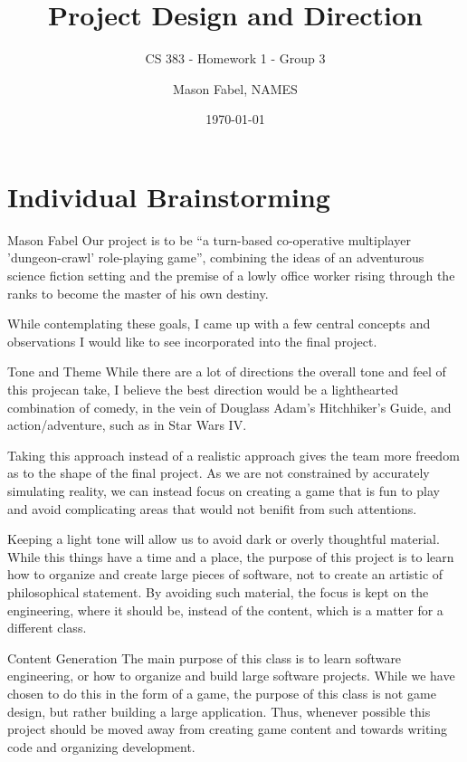 \documentclass[12pt]{report}
\title{Project Design and Direction}
\subtitle{CS 383 - Homework 1 - Group 3}
\author{Mason Fabel, NAMES} %
\date{\today}
\begin{document}
\maketitle

\chapter{Individual Brainstorming}


\begin{section}{Mason Fabel}
Our project is to be ``a turn-based co-operative multiplayer
'dungeon-crawl' role-playing game'', combining the ideas of an adventurous
science fiction setting and the premise of a lowly office worker rising
through the ranks to become the master of his own destiny.

While contemplating these goals, I came up with a few central concepts and
observations I would like to see incorporated into the final project.

\begin{subsection}{Tone and Theme}
While there are a lot of directions the overall tone and feel of this projecan take, I believe the best direction would be a lighthearted combination of comedy, in the vein of Douglass Adam's Hitchhiker's Guide, and
action/adventure, such as in Star Wars IV.

Taking this approach instead of a realistic approach gives the team more
freedom as to the shape of the final project. As we are not constrained by
accurately simulating reality, we can instead focus on creating a game that
is fun to play and avoid complicating areas that would not benifit from
such attentions.

Keeping a light tone will allow us to avoid dark or overly thoughtful
material. While this things have a time and a place, the purpose
of this project is to learn how to organize and create large pieces of
software, not to create an artistic of philosophical statement. By avoiding
such material, the focus is kept on the engineering, where it should be,
instead of the content, which is a matter for a different class.
\end{subsection}

\begin{subsection}{Content Generation}
The main purpose of this class is to learn software engineering, or how
to organize and build large software projects. While we have chosen to do
this in the form of a game, the purpose of this class is not game design,
but rather building a large application. Thus, whenever possible this
project should be moved away from creating game content and towards writing
code and organizing development.


\end{subsection}
\end{section}
\end{document}
